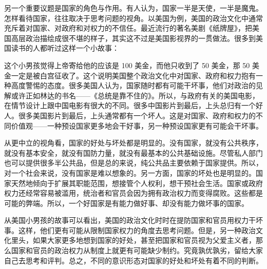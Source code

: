 另一个重要议题是国家的角色与作用。有人认为，国家一半是天使，一半是魔鬼。怎样看待国家，往往取决于思考问题的视角。以美国为例，美国的政治文化中通常充斥着对国家、对政府和对权力的不信任。最近流行的著名美剧《纸牌屋》，把美国高层政治描绘成很不堪的样子，其实这不过是美国影视界的一贯做法。很多到美国读书的人都听过这样一个小故事：


这个小男孩觉得上帝寄给他的应该是 100 美金，而他只收到了 50 美金，那 50 美金一定是被白宫征收了。这个说明美国整个政治文化中对国家、政府和权力抱有一种高度警惕的态度。很多美国人认为，国家随时都有可能干坏事，他们对政治的见解或许正如林达的书名——《总统是靠不住的》。所以，与政府有关的美国电影，在情节设计上跟中国电影有很大的不同。很多中国影片到最后，上头总归有一个好人。很多美国影片到最后，上头通常都有一个坏人。这是对国家、政府和权力的不同价值观——一种预设国家更多地会干好事，另一种预设国家更有可能会干坏事。

从更中立的视角看，国家的好处与坏处都是明显的。没有国家，就没有公共秩序，就没有基本安全，就没有国防力量，就没有最基本的公共基础设施。尽管私人部门也可以提供很多半公共品，但是总的来说，纯公共品主要依赖于国家提供。所以，对一个社会来说，没有国家是难以想象的。另一方面，国家的坏处也是明显的。国家天然地倾向于扩展其职能范围，想接管个人权利，想干预社会生活。国家或政府权力还经常容易被滥用，统治者和官员会因为拥有政治权力而变得腐败。这些都是可能的弊端。所以，一个好国家是有能力做好事、却没有能力做坏事的国家。

从美国小男孩的故事可以看出，美国的政治文化时时在提防国家和官员用权力干坏事。这样，他们更有可能从限制国家权力的角度去思考问题。但是，另一种政治文化里头，如果大家更多地想到国家的好处，甚至把国家和官员视为父爱主义者，那么国家和官员的政治权力从制度上就更有可能缺少制约。究竟孰优孰劣，留给大家自己去思考和评判。总之，不同的意识形态对国家的好处和坏处有着不同的判断。

